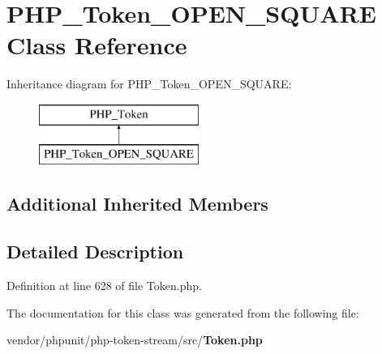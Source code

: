 \section{P\+H\+P\+\_\+\+Token\+\_\+\+O\+P\+E\+N\+\_\+\+S\+Q\+U\+A\+R\+E Class Reference}
\label{class_p_h_p___token___o_p_e_n___s_q_u_a_r_e}
Inheritance diagram for P\+H\+P\+\_\+\+Token\+\_\+\+O\+P\+E\+N\+\_\+\+S\+Q\+U\+A\+R\+E\+:\begin{figure}[H]
\begin{center}
\leavevmode
\includegraphics[height=2.000000cm]{class_p_h_p___token___o_p_e_n___s_q_u_a_r_e}
\end{center}
\end{figure}
\subsection*{Additional Inherited Members}


\subsection{Detailed Description}


Definition at line 628 of file Token.\+php.



The documentation for this class was generated from the following file\+:\begin{DoxyCompactItemize}
\item 
vendor/phpunit/php-\/token-\/stream/src/{\bf Token.\+php}\end{DoxyCompactItemize}
